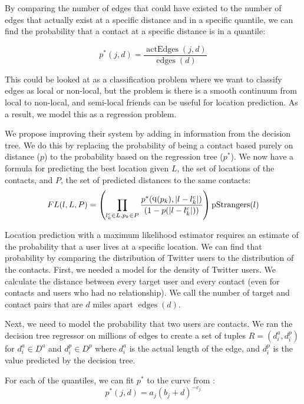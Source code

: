 \documentclass[letterpaper]{article}
\DeclareMathOperator{\pStrangers}{pStrangers}
\DeclareMathOperator{\edges}{edges}
\DeclareMathOperator{\actEdges}{actEdges}
\DeclareMathOperator{\quantile}{q}
\begin{document}
By comparing the number of edges that could have existed to the number of edges that actually exist at a specific distance and in a specific quantile, we can find the probability that a contact at a specific distance is in a quantile:

\[
p^*(j,d) = \frac{\actEdges(j,d)}{\edges(d)}
\]

This could be looked at as a classification problem where we want to classify edges as local or non-local, but the problem is there is a smooth continuum from local to non-local, and semi-local friends can be useful for location prediction. As a result, we model this as a regression problem.





We propose improving their system by adding in information from the decision tree.
%
We do this by replacing the probability of being a contact based purely on distance ($p$) to the probability based on the regression tree ($p^*$).
%
We now have a formula for predicting the best location given $L$, the set of locations of the contacts, and $P$, the set of predicted distances to the same
contacts:
\[
    FL(l,L,P) =
        \left(
            \prod_{l^c_k \in L,p_k \in P}
            {p^*(\quantile(p_k),|l-l^c_k|) \over (1-p(|l-l^c_k|))}
        \right)
        \pStrangers(l)
\]

Location prediction with a maximum likelihood estimator requires an estimate of the probability that a user lives at a specific location. We can find that probability by comparing the distribution of Twitter users to the distribution of the contacts. First, we needed a model for the density of Twitter users. We calculate the distance between every target user and every contact (even for contacts and users who had no relationship). We call the number of target and contact pairs that are $d$ miles apart $\edges(d)$.


Next, we need to model the probability that two users are contacts. We ran the decision tree regressor on millions of edges to create a set of
tuples $R = (d^a_i, d^p_i)$ for $d^a_i \in D^a$ and $d^p_i \in D^p$ where $d^a_i$ is the actual length of the edge, and $d^p_i$ is the value predicted by the decision tree. 






For each of the quantiles, we can fit $p^*$ to the curve from \cite{backstrom2010find}:
\[
    p^*(j,d) = a_{j} (b_{j}+d)^{-c_{j}}
\]
\end{document}
